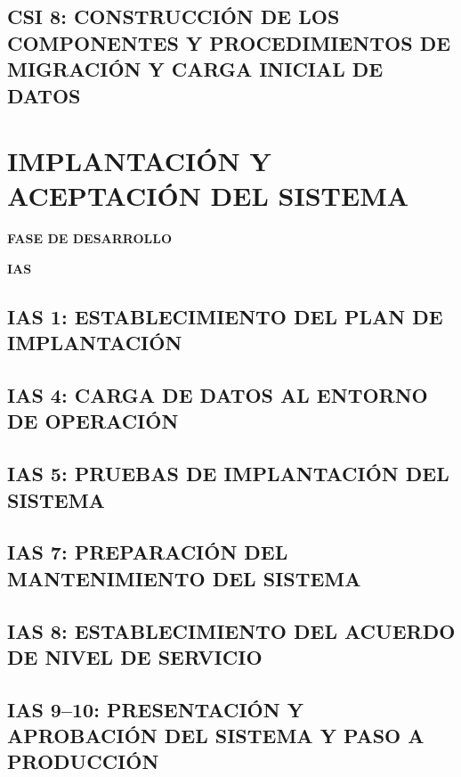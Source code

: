 \documentclass[11pt]{report}
\begin{document}
\newpage
\section{CSI 8: CONSTRUCCIÓN DE LOS COMPONENTES Y PROCEDIMIENTOS DE MIGRACIÓN Y CARGA INICIAL DE DATOS}



\newpage
\chapter{IMPLANTACIÓN Y ACEPTACIÓN DEL SISTEMA}
	\vspace{2cm}	
	\begin{center}
	{\Large \textbf{FASE DE DESARROLLO} \par}
	\end{center}
	\vspace{5cm}
	
	\begin{center}
	\Huge \textbf{IAS}\par
	\end{center}

\newpage

\section{IAS 1: ESTABLECIMIENTO DEL PLAN DE IMPLANTACIÓN}


\newpage
\section{IAS 4: CARGA DE DATOS AL ENTORNO DE OPERACIÓN}


\newpage
\section{IAS 5: PRUEBAS DE IMPLANTACIÓN DEL SISTEMA}


\newpage
\section{IAS 7: PREPARACIÓN DEL MANTENIMIENTO DEL SISTEMA}


\newpage
\section{IAS 8: ESTABLECIMIENTO DEL ACUERDO DE NIVEL DE SERVICIO}


\newpage
\section{IAS 9--10: PRESENTACIÓN Y APROBACIÓN DEL SISTEMA Y PASO A PRODUCCIÓN}
\end{document}
